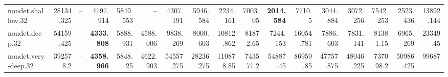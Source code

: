\documentclass[varwidth,border=2pt]{standalone}
\begin{document}
\begin{center}
{\begin{tabular}{lrrrrrrrrrrrrrrrr}
nondet.shallow.32 & 28134.325 & -- & 4197.914 & 5849.553 & -- & 4307.191 & 5946.584 & 2234.161 & 7003.05 & \textbf{2014.584} & 7710.5 & 3044.884 & 3072.256 & 7542.253 & 2523.436 & 13892.144 \\
nondet.deep.32 & 54159.425 & -- & \textbf{4333.808} & 5888.931 & 4588.006 & 9838.269 & 8000.603 & 10812.862 & 81872.65 & 7244.153 & 16054.781 & 7886.603 & 7831.141 & 81381.15 & 6965.269 & 23349.45 \\
nondet.very-deep.32 & 392578.2 & -- & \textbf{4358.966} & 5848.25 & 4622.903 & 54557.275 & 28236.275 & 110878.85 & 743571.2 & 54887.45 & 86959.85 & 47757.875 & 48046.225 & 737098.2 & 50986.425 & 99687 \\
\bottomrule
\end{tabular}
}
\end{center}
\end{document}
